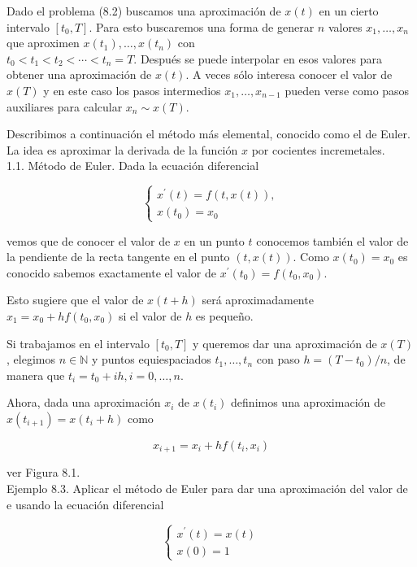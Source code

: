 \documentclass[10pt]{book}
\begin{document}
Dado el problema (8.2) buscamos una aproximación de $x(t)$ en un cierto intervalo $\left[t_{0}, T\right]$. Para esto buscaremos una forma de generar $n$ valores $x_{1}, \ldots, x_{n}$ que aproximen $x\left(t_{1}\right), \ldots, x\left(t_{n}\right)$ con\\
$t_{0}<t_{1}<t_{2}<\cdots<t_{n}=T$. Después se puede interpolar en esos valores para obtener una aproximación de $x(t)$. A veces sólo interesa conocer el valor de $x(T)$ y en este caso los pasos intermedios $x_{1}, \ldots, x_{n-1}$ pueden verse como pasos auxiliares para calcular $x_{n} \sim x(T)$.

Describimos a continuación el método más elemental, conocido como el de Euler. La idea es aproximar la derivada de la función $x$ por cocientes incremetales.\\
1.1. Método de Euler. Dada la ecuación diferencial

$$
\left\{\begin{array}{l}
x^{\prime}(t)=f(t, x(t)), \\
x\left(t_{0}\right)=x_{0}
\end{array}\right.
$$

vemos que de conocer el valor de $x$ en un punto $t$ conocemos también el valor de la pendiente de la recta tangente en el punto $(t, x(t))$. Como $x\left(t_{0}\right)=x_{0}$ es conocido sabemos exactamente el valor de $x^{\prime}\left(t_{0}\right)=f\left(t_{0}, x_{0}\right)$.

Esto sugiere que el valor de $x(t+h)$ será aproximadamente $x_{1}=x_{0}+h f\left(t_{0}, x_{0}\right)$ si el valor de $h$ es pequeño.

Si trabajamos en el intervalo $\left[t_{0}, T\right]$ y queremos dar una aproximación de $x(T)$, elegimos $n \in \mathbb{N}$ y puntos equiespaciados $t_{1}, \ldots, t_{n}$ con paso $h=\left(T-t_{0}\right) / n$, de manera que $t_{i}=t_{0}+i h, i=0, \ldots, n$.

Ahora, dada una aproximación $x_{i}$ de $x\left(t_{i}\right)$ definimos una aproximación de $x\left(t_{i+1}\right)=x\left(t_{i}+h\right)$ como


\begin{equation*}
x_{i+1}=x_{i}+h f\left(t_{i}, x_{i}\right) \tag{8.3}
\end{equation*}


ver Figura 8.1.\\
Ejemplo 8.3. Aplicar el método de Euler para dar una aproximación del valor de e usando la ecuación diferencial

$$
\left\{\begin{array}{l}
x^{\prime}(t)=x(t) \\
x(0)=1
\end{array}\right.
$$
\end{document}
